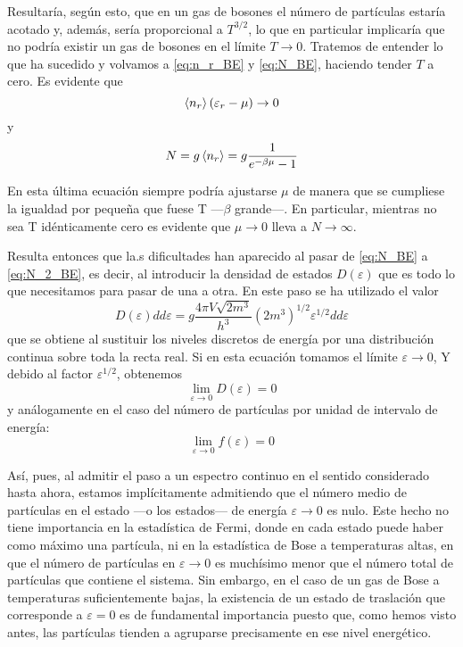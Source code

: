 Resultaría, según esto, que en un gas de bosones el número de partículas estaría acotado y, además, sería proporcional a $T^{3/2}$, lo que en particular implicaría que no podría existir un gas de bosones en el límite $T \rightarrow 0$.
Tratemos de entender lo que ha sucedido y volvamos a \eqref{eq:n_r_BE} y \eqref{eq:N_BE}, haciendo tender $T$ a cero. Es evidente que
$$\expval{n_r}(\varepsilon_r - \mu) \rightarrow 0$$
y
$$N = g\expval{n_r} = g \frac{1}{e^{-\beta\mu} - 1}$$

En esta última ecuación siempre podría ajustarse $\mu$ de manera que se cumpliese la igualdad por pequeña que fuese T ---$\beta$ grande---.
En particular, mientras no sea T idénticamente cero es evidente que $\mu \rightarrow 0$ lleva a $N \rightarrow \infty$.

Resulta entonces que la.s dificultades han aparecido al pasar de \eqref{eq:N_BE} a \eqref{eq:N_2_BE}, es decir, al introducir la densidad de estados $D(\varepsilon)$ que es todo lo que necesitamos para pasar de una a otra.
En este paso se ha utilizado el valor
\begin{equation}\label{eq:D_vareps_BE}
	D(\varepsilon) dd{\varepsilon} = g \frac{4\pi V\sqrt{2m^3}}{h^3} (2m^3)^{1/2} \varepsilon^{1/2} dd{\varepsilon}
\end{equation}
que se obtiene al sustituir los niveles discretos de energía por una distribución continua sobre toda la recta real.
Si en esta ecuación tomamos el límite $\varepsilon \rightarrow 0$, Y debido al factor $\varepsilon^{1/2}$, obtenemos
$$\lim\limits_{\varepsilon \rightarrow 0} D(\varepsilon) = 0$$
y análogamente en el caso del número de partículas por unidad de intervalo de energía:
$$\lim\limits_{\varepsilon \rightarrow 0} f(\varepsilon) = 0$$

Así, pues, al admitir el paso a un espectro continuo en el sentido considerado hasta ahora, estamos implícitamente admitiendo que el número medio de partículas en el estado ---o los estados--- de energía $\varepsilon \rightarrow 0$ es nulo.
Este hecho no tiene importancia en la estadística de Fermi, donde en cada estado puede haber como máximo una partícula, ni en la estadística de Bose a temperaturas altas, en que el número de partículas en $\varepsilon \rightarrow 0$ es muchísimo menor que el número total de partículas que contiene el sistema.
Sin embargo, en el caso de un gas de Bose a temperaturas suficientemente bajas, la existencia de un estado de traslación que corresponde a $\varepsilon = 0$ es de fundamental importancia puesto que, como hemos visto antes, las partículas tienden a agruparse precisamente en ese nivel energético.

